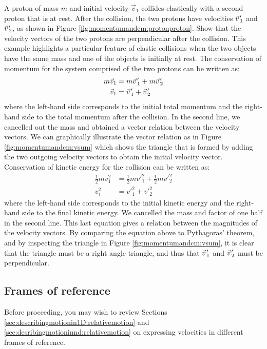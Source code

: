 \begin{example}{
 A proton of mass $m$ and initial velocity $\vec v_1$ collides elastically with a second proton that is at rest. After the collision, the two protons have velocities $\pvec v'_1$ and $\pvec v'_2$, as shown in Figure \ref{fig:momentumandcm:protonproton}. Show that the velocity vectors of the two protons are perpendicular after the collision.}
This example highlights a particular feature of elastic collisions when the two objects have the same mass and one of the objects is initially at rest. The conservation of momentum for the system comprised of the two protons can be written as:
\begin{align*}
m\vec v_1 &= m\pvec v'_1 + m\pvec v'_2\\
\vec v_1 &= \pvec v'_1 + \pvec v'_2
\end{align*}
where the left-hand side corresponds to the initial total momentum and the right-hand side to the total momentum after the collision. In the second line, we cancelled out the mass and obtained a vector relation between the velocity vectors. We can graphically illustrate the vector relation as in Figure \ref{fig:momentumandcm:vsum} which shows the triangle that is formed by adding the two outgoing velocity vectors to obtain the initial velocity vector.
Conservation of kinetic energy for the collision can be written as:
\begin{align*}
\frac{1}{2}mv_1^2 &= \frac{1}{2}mv'^2_1+\frac{1}{2}mv'^2_2\\
v_1^2 &= v'^2_1+ v'^2_2
\end{align*}
where the left-hand side corresponds to the initial kinetic energy and the right-hand side to the final kinetic energy. We cancelled the mass and factor of one half in the second line. This last equation gives a relation between the magnitudes of the velocity vectors. By comparing the equation above to Pythagoras' theorem, and by inspecting the triangle in Figure \ref{fig:momentumandcm:vsum}, it is clear that the triangle must be a right angle triangle, and thus that $\pvec v'_1$ and $\pvec v'_2$ must be perpendicular.
\end{example}

\subsection{Frames of reference}
\begin{review}
Before proceeding, you may wish to review Sections \ref{sec:describingmotionin1D:relativemotion} and  \ref{sec:desribingmotioninnd:relativemotion} on expressing velocities in different frames of reference.
\end{review}

